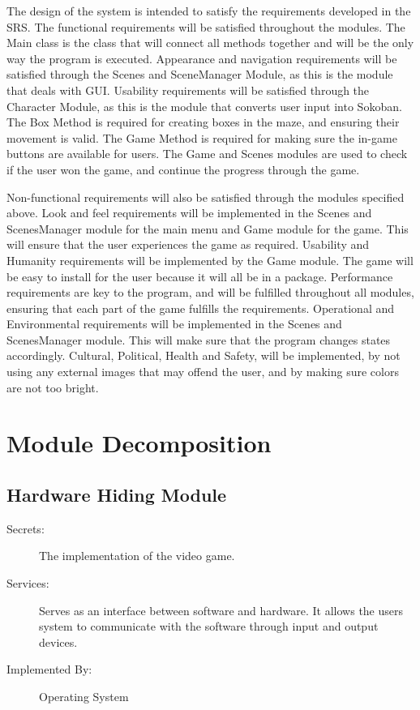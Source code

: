 \documentclass[12pt, titlepage]{article}
\begin{document}
The design of the system is intended to satisfy the requirements developed in
the SRS. The functional requirements will be satisfied throughout the modules. The Main class is the class that will connect all methods together and will be the only way the program is executed. Appearance and navigation requirements will be satisfied through the Scenes and SceneManager Module, as this is the module that deals with GUI. Usability requirements will be satisfied through the Character Module, as this is the module that converts user input into Sokoban. The Box Method is required for creating boxes in the maze, and ensuring their movement is valid. The Game Method is required for making sure the in-game buttons are available for users. The Game and Scenes modules are used to check if the user won the game, and continue the progress through the game.

Non-functional requirements will also be satisfied through the modules specified above. Look and feel requirements will be implemented in the Scenes and ScenesManager module for the main menu and Game module for the game. This will ensure that the user experiences the game as required. Usability and Humanity requirements will be implemented by the Game module. The game will be easy to install for the user because it will all be in a package. Performance requirements are key to the program, and will be fulfilled throughout all modules, ensuring that each part of the game fulfills the requirements. Operational and Environmental requirements will be implemented in the Scenes and ScenesManager module. This will make sure that the program changes states accordingly. Cultural, Political, Health and Safety, will be implemented, by not using any external images that may offend the user, and by making sure colors are not too bright.

\section{Module Decomposition} \label{SecMD}

\subsection{Hardware Hiding Module}

\begin{description}
\item[Secrets:] The implementation of the video game.
\item[Services:] Serves as an interface between software and hardware. It allows the users system to communicate with the software through input and output devices.
\item[Implemented By:] Operating System
\end{description}
\end{document}
